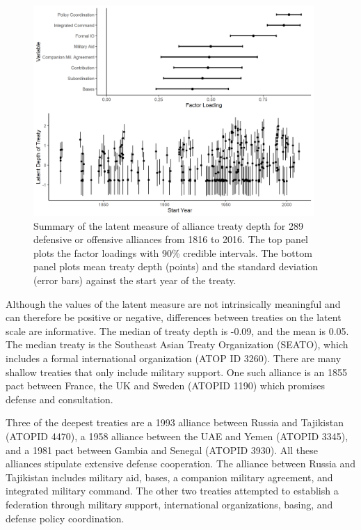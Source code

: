 \documentclass[12pt]{article}
\begin{document}
\begin{figure}
	\centering
		\includegraphics[width=0.95\textwidth]{../figures/ld-summary.png}
	\caption{Summary of the latent measure of alliance treaty depth for 289 defensive or offensive alliances from 1816 to 2016. The top panel plots the factor loadings with 90\% credible intervals. The bottom panel plots mean treaty depth (points) and the standard deviation (error bars) against the start year of the treaty.}
	\label{fig:ld-summary}
\end{figure}


Although the values of the latent measure are not intrinsically meaningful and can therefore be positive or negative, differences between treaties on the latent scale are informative. 
The median of treaty depth is -0.09, and the mean is 0.05. 
The median treaty is the Southeast Asian Treaty Organization (SEATO), which includes a formal international organization (ATOP ID 3260). 
There are many shallow treaties that only include military support. 
One such alliance is an 1855 pact between France, the UK and Sweden (ATOPID 1190) which promises defense and consultation. 


Three of the deepest treaties are a 1993 alliance between Russia and Tajikistan (ATOPID 4470), a 1958 alliance between the UAE and Yemen (ATOPID 3345), and a 1981 pact between Gambia and Senegal (ATOPID 3930). 
All these alliances stipulate extensive defense cooperation. 
The alliance between Russia and Tajikistan includes military aid, bases, a companion military agreement, and integrated military command. 
The other two treaties attempted to establish a federation through military support, international organizations, basing, and defense policy coordination.
\end{document}
